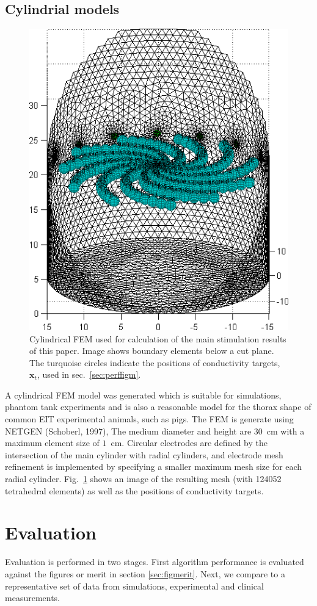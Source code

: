 \documentclass[12pt]{iopart}
\newcommand{\xB}{\mbox{$\mathbf{x}$}}
\begin{document}
\subsection{Cylindrial models}

\begin{figure}[bhtp]
\begin{center}
  \includegraphics[width= 0.4 \textwidth, bb=0 0 444 517]
         {../../tutorial/GREIT-evaluation/simulation_3d_test02a.png}
\caption{ \label{fig:CylMesh}
Cylindrical FEM used for calculation of the main stimulation
results of this paper. Image shows boundary elements below a cut plane.
The turquoise circles indicate the
positions of conductivity targets, $\xB_t$, used in
sec.\ \ref{sec:perffigm}.
}
\end{center}
\end{figure}

A cylindrical FEM model was generated which is suitable for
simulations, phantom tank experiments and is also a reasonable
model for the thorax shape of common EIT experimental animals,
such as pigs.  The FEM is generate using NETGEN (Schoberl, 1997),
The medium diameter
and height are $30$~cm with a maximum element size of $1$~cm.
Circular electrodes are defined by the intersection of the 
main cylinder with radial cylinders, and
electrode mesh refinement is implemented by specifying a
smaller maximum mesh size for each radial cylinder.
Fig.\ \ref{fig:CylMesh} shows an image of the resulting
mesh (with 124052 tetrahedral elements) as well as the positions
of conductivity targets.



\section{Evaluation}

Evaluation is performed in two stages. First algorithm performance
is evaluated against the figures or merit in section
\ref{sec:figmerit}.
Next, we compare to a representative set of data
from simulations, experimental and clinical measurements.
\end{document}
